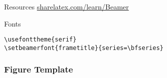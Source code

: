 \documentclass[9pt]{beamer}
\begin{document}
\begin{frame}{Resources}
    \url{sharelatex.com/learn/Beamer}
\end{frame}%

\begin{frame}[fragile=singleslide]{Fonts}
    \begin{verbatim}
\usefonttheme{serif}
\setbeamerfont{frametitle}{series=\bfseries}
    \end{verbatim}





\end{frame}

\begin{frame}
    \frametitle{Figure Template}




\end{frame}
\end{document}
